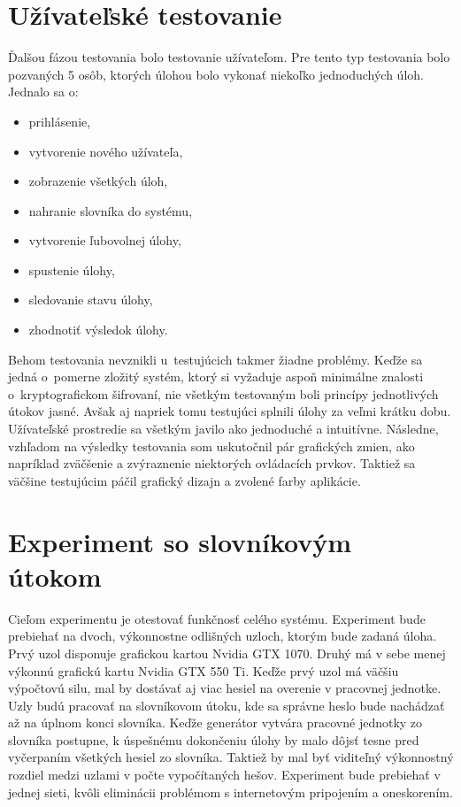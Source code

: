 \documentclass[zadani,slovak]{fitthesis}
\begin{document}
\section{Užívateľské testovanie}
Ďalšou fázou testovania bolo testovanie užívateľom. Pre tento typ testovania bolo pozvaných 5 osôb, ktorých úlohou bolo vykonať niekoľko jednoduchých úloh. Jednalo sa o:
\begin{itemize}
    \item prihlásenie,
    \item vytvorenie nového užívateľa,
    \item zobrazenie všetkých úloh,
    \item nahranie slovníka do systému,
    \item vytvorenie ľubovolnej úlohy,
    \item spustenie úlohy,
    \item sledovanie stavu úlohy,
    \item zhodnotiť výsledok úlohy.
\end{itemize}
Behom testovania nevznikli u~testujúcich takmer žiadne problémy. Keďže sa jedná o~pomerne zložitý systém, ktorý si vyžaduje aspoň minimálne znalosti o~kryptografickom šifrovaní, nie všetkým testovaným boli princípy jednotlivých útokov jasné. Avšak aj napriek tomu testujúci splnili úlohy za veľmi krátku dobu. Užívateľské prostredie sa všetkým javilo ako jednoduché a intuitívne. Následne, vzhľadom na výsledky testovania som uskutočnil pár grafických zmien, ako napríklad zväčšenie a zvýraznenie niektorých ovládacích prvkov. Taktiež sa väčšine testujúcim páčil grafický dizajn a zvolené farby aplikácie.  

\section{Experiment so slovníkovým útokom}
Cieľom experimentu je otestovať funkčnosť celého systému. Experiment bude prebiehať na dvoch, výkonnostne odlišných uzloch, ktorým bude zadaná úloha. Prvý uzol disponuje grafickou kartou Nvidia GTX 1070. Druhý má v sebe menej výkonnú grafickú kartu Nvidia GTX 550 Ti. Keďže prvý uzol má väčšiu výpočtovú silu, mal by dostávať aj viac hesiel na overenie v pracovnej jednotke. Uzly budú pracovať na slovníkovom útoku, kde sa správne heslo bude nachádzať až na úplnom konci slovníka. Keďže generátor vytvára pracovné jednotky zo slovníka postupne, k úspešnému dokončeniu úlohy by malo dôjsť tesne pred vyčerpaním všetkých hesiel zo slovníka. Taktiež by mal byť viditeľný výkonnostný rozdiel medzi uzlami v počte vypočítaných hešov. Experiment bude prebiehať v jednej sieti, kvôli eliminácii problémom s internetovým pripojením a oneskorením.
\end{document}
